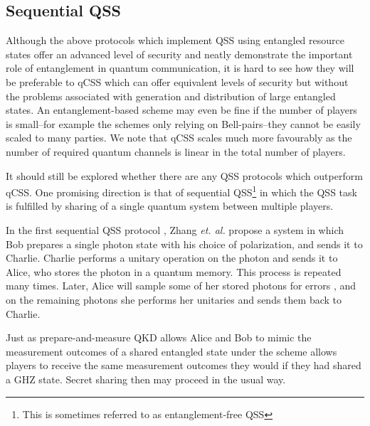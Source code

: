


\subsection{Sequential QSS}
Although the above protocols which implement QSS using entangled resource states offer an advanced level of security and neatly demonstrate the important role of entanglement in quantum communication, it is hard to see how they will be preferable to qCSS which can offer equivalent levels of security but without the problems associated with generation and distribution of large entangled states. An entanglement-based scheme may even be fine if the number of players is small--for example the schemes \cite{Karlsson1999}  only relying on Bell-pairs--they cannot be easily scaled to many parties. We note that qCSS scales much more favourably as the number of required quantum channels is linear in the total number of players.

It should still be explored whether there are any QSS protocols which outperform qCSS. One promising direction is that of sequential QSS\footnote{This is sometimes referred to as entanglement-free QSS} in which the QSS task is fulfilled by sharing of a single quantum system between multiple players.

In the first sequential QSS protocol \cite{Zhang2005}, Zhang \emph{et. al.} propose a system in which Bob prepares a single photon state with his choice of polarization, and sends it to Charlie. Charlie performs a unitary operation  on the photon and sends it to Alice, who stores the photon in a quantum memory. This process is repeated many times. Later, Alice will sample some of her stored photons for errors , and on the remaining photons she performs her unitaries  and sends them back to Charlie. 

Just as prepare-and-measure QKD allows Alice and Bob to mimic the measurement outcomes of a shared entangled state  under  the scheme \cite{Zhang2005} allows players to receive the same measurement outcomes they would if they had shared a GHZ state. Secret sharing then may proceed in the usual way. 

